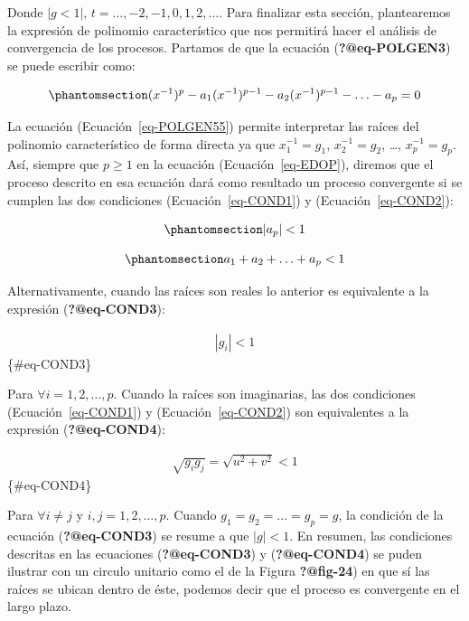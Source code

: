 \documentclass[
  a4paper,
]{article}
\begin{document}
Donde \(|{g} < 1|\), \(t = \ldots, -2, -1, 0, 1, 2, \ldots\). Para
finalizar esta sección, plantearemos la expresión de polinomio
característico que nos permitirá hacer el análisis de convergencia de
los procesos. Partamos de que la ecuación (\textbf{?@eq-POLGEN3}) se
puede escribir como:

\begin{equation}\phantomsection\label{eq-POLGEN55}{
    (x^{-1})^p - a_1 (x^{-1})^{p-1} - a_2 (x^{-1})^{p-1} - \ldots - a_p = 0
}\end{equation}

La ecuación (Ecuación~\ref{eq-POLGEN55}) permite interpretar las raíces
del polinomio característico de forma directa ya que \(x^{-1}_1 = g_1\),
\(x^{-1}_2 = g_2\), \ldots, \(x^{-1}_p = g_p\). Así, siempre que
\(p \geq 1\) en la ecuación (Ecuación~\ref{eq-EDOP}), diremos que el
proceso descrito en esa ecuación dará como resultado un proceso
convergente si se cumplen las dos condiciones (Ecuación~\ref{eq-COND1})
y (Ecuación~\ref{eq-COND2}):

\begin{equation}\phantomsection\label{eq-COND1}{
    |a_p| < 1  
}\end{equation}

\begin{equation}\phantomsection\label{eq-COND2}{
    a_1 + a_2 + \ldots + a_p < 1
}\end{equation}

Alternativamente, cuando las raíces son reales lo anterior es
equivalente a la expresión (\textbf{?@eq-COND3}):

\begin{eqnarray}
    |g_i| < 1
\end{eqnarray} \{\#eq-COND3\}

Para \(\forall i = 1, 2, \ldots, p\). Cuando la raíces son imaginarias,
las dos condiciones (Ecuación~\ref{eq-COND1}) y
(Ecuación~\ref{eq-COND2}) son equivalentes a la expresión
(\textbf{?@eq-COND4}):

\begin{eqnarray}
    \sqrt{g_i g_j} = \sqrt{u^2 + v^2} < 1 
\end{eqnarray} \{\#eq-COND4\}

Para \(\forall i \neq j\) y \(i, j = 1, 2, \ldots, p\). Cuando
\(g_1 = g_2 = \ldots = g_p = g\), la condición de la ecuación
(\textbf{?@eq-COND3}) se resume a que \(|g| < 1\). En resumen, las
condiciones descritas en las ecuaciones (\textbf{?@eq-COND3}) y
(\textbf{?@eq-COND4}) se puden ilustrar con un circulo unitario como el
de la Figura \textbf{?@fig-24}) en que sí las raíces se ubican dentro de
éste, podemos decir que el proceso es convergente en el largo plazo.
\end{document}
